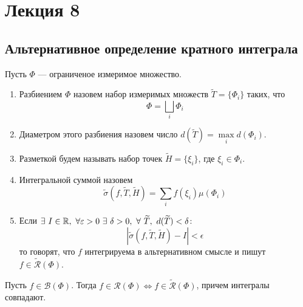 \section{Лекция 8}
\subsection{Альтернативное определение кратного интеграла}
\begin{definition}
    Пусть $\Phi$ --- ограниченое измеримое множество. 
    \begin{enumerate}
        \item Разбиением $\Phi$ назовем набор измеримых множеств $\widetilde{T}=\{\Phi_i\}$ таких, что 
        \[\Phi=\bigsqcup\limits_i \Phi_i\]
        \item Диаметром этого разбиения назовем число $d(\widetilde{T})=\max\limits_i d(\Phi_i)$.
        \item Разметкой будем называть набор точек $\widetilde{H}=\{\xi_i\}$, где $\xi_i\in \Phi_i$.
        \item Интегральной суммой назовем
        \[\widetilde{\sigma}(f, \widetilde{T}, \widetilde{H})=\sum\limits_{i} f(\xi_i)\mu(\Phi_i)\]
        \item Если $\exists\ I\in \R,\ \forall \epsilon>0\ \exists\ \delta>0,\ \forall\ \widetilde{T},\ d(\widetilde{T})<\delta$:
        \[|\widetilde{\sigma}(f,\widetilde{T},\widetilde{H})-I|<\epsilon\]
        то говорят, что $f$ интегрируема в альтернативном смысле и пишут\\
        $f\in \widetilde{\mathcal{R}}(\Phi)$.
    \end{enumerate}
\end{definition}
\begin{theorem}
    Пусть $f\in \mathcal{B}(\Phi)$. Тогда $f\in \mathcal{R}(\Phi) \Leftrightarrow f\in \widetilde{\mathcal{R}}(\Phi)$, причем интегралы совпадают.
\end{theorem}
